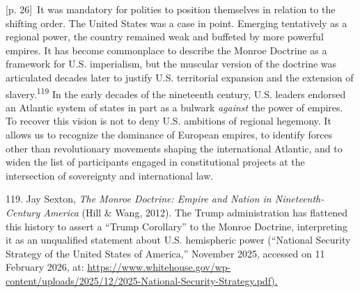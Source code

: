 \documentclass[10pt,a4paper]{article}
\begin{document}
{\scriptsize\color{gray} [p. 26]}\ It was mandatory for polities to position themselves in relation to the shifting order. The United States was a case in point. Emerging tentatively as a regional power, the country remained weak and buffeted by more powerful empires. It has become commonplace to describe the Monroe Doctrine as a framework for U.S. imperialism, but the muscular version of the doctrine was articulated decades later to justify U.S. territorial expansion and the extension of slavery.\nobreak\textsuperscript{119} In the early decades of the nineteenth century, U.S. leaders endorsed an Atlantic system of states in part as a bulwark \textit{against} the power of empires. To recover this vision is not to deny U.S. ambitions of regional hegemony. It allows us to recognize the dominance of European empires, to identify forces other than revolutionary movements shaping the international Atlantic, and to widen the list of participants engaged in constitutional projects at the intersection of sovereignty and international law.\par{\small 119. Jay Sexton, \textit{The Monroe Doctrine: Empire and Nation in Nineteenth-Century America} (Hill \& Wang, 2012). The Trump administration has flattened this history to assert a “Trump Corollary” to the Monroe Doctrine, interpreting it as an unqualified statement about U.S. hemispheric power (“National Security Strategy of the United States of America,” November 2025, accessed on 11 February 2026, at: \url{https://www.whitehouse.gov/wp-content/uploads/2025/12/2025-National-Security-Strategy.pdf).}\par}
\end{document}

